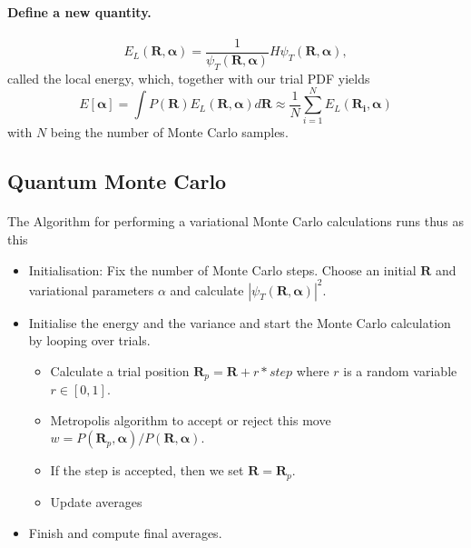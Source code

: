 \documentclass[%
oneside,                 %
final,                   %
10pt]{article}
\begin{document}
\paragraph{Define a new quantity.}
\[
   E_L(\bm{R},\bm{\alpha})=\frac{1}{\psi_T(\bm{R},\bm{\alpha})}H\psi_T(\bm{R},\bm{\alpha}),
\]
called the local energy, which, together with our trial PDF yields
\[
  E[\bm{\alpha}]=\int P(\bm{R})E_L(\bm{R},\bm{\alpha}) d\bm{R}\approx \frac{1}{N}\sum_{i=1}^NE_L(\bm{R_i},\bm{\alpha})
\]
with $N$ being the number of Monte Carlo samples.




\subsection{Quantum Monte Carlo}

\paragraph{}
The Algorithm for performing a variational Monte Carlo calculations runs thus as this

\begin{itemize}
   \item Initialisation: Fix the number of Monte Carlo steps. Choose an initial $\bm{R}$ and variational parameters $\alpha$ and calculate $\left|\psi_T(\bm{R},\bm{\alpha})\right|^2$. 

   \item Initialise the energy and the variance and start the Monte Carlo calculation by looping over trials.
\begin{itemize}

      \item Calculate  a trial position  $\bm{R}_p=\bm{R}+r*step$ where $r$ is a random variable $r \in [0,1]$.

      \item Metropolis algorithm to accept or reject this move  $w = P(\bm{R}_p,\bm{\alpha})/P(\bm{R},\bm{\alpha})$.

      \item If the step is accepted, then we set $\bm{R}=\bm{R}_p$. 

      \item Update averages

\end{itemize}

\noindent
   \item Finish and compute final averages.
\end{itemize}
\end{document}
